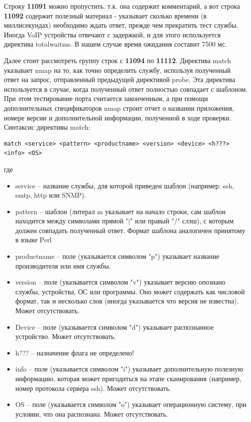 Строку \textbf{11091} можно пропустить. т.к. она содержит комментарий, а вот строка \textbf{11092} содержит полезный материал - указывает сколько времени (в миллисекундах) необходимо ждать ответ, прежде чем прекратить тест службы. Иногда VoIP устройства отвечают с задержкой, и для этого используется директива totalwaitms. В нашем случае время ожидания составит 7500 мс.

Далее стоит рассмотреть группу строк с \textbf{11094} по \textbf{11112}. Директива match указывает nmap на то, как точно определить службу, используя полученный ответ на запрос, отправленный предыдущей директивой probe. Эта директива используется в случае, когда полученный ответ полностью совпадает с шаблоном. При этом тестирование порта считается законченным, а при помощи дополнительных спецификаторов nmap строит отчет о названии приложения, номере версии и дополнительной информации, полученной в ходе проверки. Синтаксис директивы match:
\begin{Verbatim}[frame=single]
match <service> <pattern> <productname> <version> <device> <h???> <info> <OS>
\end{Verbatim}
где
\begin{itemize}
  \item service -- название службы, для которой приведен шаблон (например: ssh, smtp, http или SNMP). 
  \item pattern -- шаблон (литерал m указывает на начало строки, сам шаблон находится между символами прямой "|" или правый "/" слэш), с которым должен совпадать полученный ответ. Формат шаблона аналогичен принятому в языке Perl
  \item productname -- поле (указывается символом "p") указывает название производителя или имя службы.
  \item version -- поле (указывается символом "v") указывает версию опознано службы, устройства, ОС или программы. Оно может содержать как числовой формат, так и несколько слов (иногда указывается что версия не известна). Может отсутствовать.
  \item Device -- поле (указывается символом "d") указывает распознанное устройство. Может отсутствовать.
  \item h??? -- назначение флага не определено!
  \item info -- поле (указывается символом "i") указывает дополнительную полезную информацию, которая может пригодиться на этапе сканирования (например, номер протокола сервера ssh). Может отсутствовать.
  \item OS -- поле (указывается символом "o") указывает операционную систему, при условии, что она распознана. Может отсутствовать.
\end{itemize}


